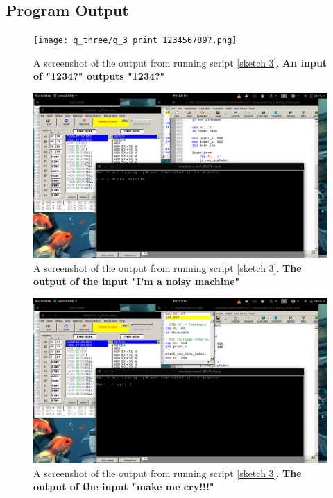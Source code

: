 \documentclass[]{article}
\begin{document}
\subsection{Program Output}


\begin{figure}[h]
	\texttt{[image: q\_three/q\_3 print 123456789?.png]}
	\centering
	\caption{A screenshot of the output from running script \ref{sketch 3}. \textbf{An input of "1234?" outputs "1234?"}}
	\label{fig:5}
\end{figure}


\begin{figure}[h]
	\includegraphics[width=12cm]{q_three/q_3_printing_I'm a noisy machine.png}
	\centering
	\caption{A screenshot of the output from running script \ref{sketch 3}. \textbf{The output of the input "I'm a noisy machine"}}
\end{figure}


\begin{figure}[h]
	\includegraphics[width=12cm]{q_three/Q3_printing_make_me_cry!!!.png}
	\centering
	\caption{A screenshot of the output from running script \ref{sketch 3}. \textbf{The output of the input "make me cry!!!"}}
\end{figure}
\end{document}
